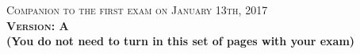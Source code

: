 \documentclass{docist}
\begin{document}
\thispagestyle{empty}

\begin{center}
  {\Large \textsc{Companion to the first exam on January 13th, 2017\\[2ex]
  \textbf{Version: A}\\[2ex]}}
  {\normalsize  \textbf{(You do not need to turn in this set of pages with your exam)}}
\end{center}





\qSoftwareArchitectureOne



\qRequirementsImpact



\qAvailabilityScenarioOne



\qAvailabilityVotingEN



\qMWResourceLoaderTacticEEEN



\qPerfomanceTacticOne



\qScalabilityINGLES



\qLayersTactics



\qHadoopDisponibilidadeDadosINGLES



\qHadoopTacticasRecuperacaoFaltasINGLES



\qSecondEEEN



\qModuleViewType



\qMemcachedModulesINGLES



\qAspectsINGLES



\qLayeredAspectsDataModelTwo



\qAdventureBuilderThree
\end{document}
